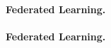 \documentclass[twoside,11pt]{article}
\begin{document}
\vspace{0.08in}
\paragraph{Federated Learning.} \lipsum[35]

\vspace{0.08in}
\paragraph{Federated Learning.} \lipsum[35]



\newpage

\textbf{\scalebox{1.3}{References}}
\vspace{-0.3in}

\end{document}

